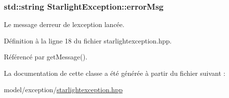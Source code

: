 \subsubsection[{error\+Msg}]{\setlength{\rightskip}{0pt plus 5cm}std\+::string Starlight\+Exception\+::error\+Msg\hspace{0.3cm}{\ttfamily [private]}}\label{classStarlightException_aa235f0c10c5ad918b0c2911c72a85fcb}


Le message d\textquotesingle{}erreur de l\textquotesingle{}exception lancée. 



Définition à la ligne 18 du fichier starlightexception.\+hpp.



Référencé par get\+Message().



La documentation de cette classe a été générée à partir du fichier suivant \+:\begin{DoxyCompactItemize}
\item 
model/exception/\hyperlink{starlightexception_8hpp}{starlightexception.\+hpp}\end{DoxyCompactItemize}
